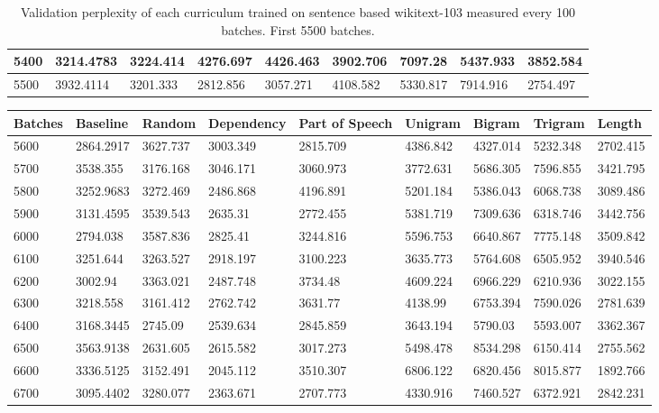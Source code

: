 \documentclass [11pt, proquest] {uwthesis}[2020/12/20]
\begin{document}
\begin{table}[]
\begin{tiny}
\begin{tabular}{|l|l|l|l|l|l|l|l|l|}
5400 & 3214.4783 & 3224.414 & 4276.697 & 4426.463 & 3902.706 & 7097.28 & 5437.933 & 3852.584 \\ \hline
5500 & 3932.4114 & 3201.333 & 2812.856 & 3057.271 & 4108.582 & 5330.817 & 7914.916 & 2754.497 \\ \hline
\end{tabular}
\caption{Validation perplexity of each curriculum trained on sentence based wikitext-103 measured every 100 batches. First 5500 batches.}
\label{tab:wikitext-103-sentence-1}
\end{tiny}
\end{table}
\begin{table}[]
\centering
\begin{tiny}
\begin{tabular}{|l|l|l|l|l|l|l|l|l|}
\hline
Batches & Baseline & Random & Dependency & Part of Speech & Unigram & Bigram & Trigram & Length \\ \hline
5600 & 2864.2917 & 3627.737 & 3003.349 & 2815.709 & 4386.842 & 4327.014 & 5232.348 & 2702.415 \\ \hline
5700 & 3538.355 & 3176.168 & 3046.171 & 3060.973 & 3772.631 & 5686.305 & 7596.855 & 3421.795 \\ \hline
5800 & 3252.9683 & 3272.469 & 2486.868 & 4196.891 & 5201.184 & 5386.043 & 6068.738 & 3089.486 \\ \hline
5900 & 3131.4595 & 3539.543 & 2635.31 & 2772.455 & 5381.719 & 7309.636 & 6318.746 & 3442.756 \\ \hline
6000 & 2794.038 & 3587.836 & 2825.41 & 3244.816 & 5596.753 & 6640.867 & 7775.148 & 3509.842 \\ \hline
6100 & 3251.644 & 3263.527 & 2918.197 & 3100.223 & 3635.773 & 5764.608 & 6505.952 & 3940.546 \\ \hline
6200 & 3002.94 & 3363.021 & 2487.748 & 3734.48 & 4609.224 & 6966.229 & 6210.936 & 3022.155 \\ \hline
6300 & 3218.558 & 3161.412 & 2762.742 & 3631.77 & 4138.99 & 6753.394 & 7590.026 & 2781.639 \\ \hline
6400 & 3168.3445 & 2745.09 & 2539.634 & 2845.859 & 3643.194 & 5790.03 & 5593.007 & 3362.367 \\ \hline
6500 & 3563.9138 & 2631.605 & 2615.582 & 3017.273 & 5498.478 & 8534.298 & 6150.414 & 2755.562 \\ \hline
6600 & 3336.5125 & 3152.491 & 2045.112 & 3510.307 & 6806.122 & 6820.456 & 8015.877 & 1892.766 \\ \hline
6700 & 3095.4402 & 3280.077 & 2363.671 & 2707.773 & 4330.916 & 7460.527 & 6372.921 & 2842.231 \\ \hline

\end{tabular}
\end{tiny}
\end{table}
\end{document}
